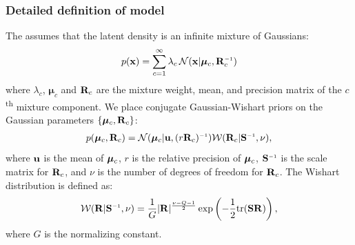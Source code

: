\subsubsection{Detailed definition of model}

The \iwmm{} assumes that the latent density is an infinite mixture of Gaussians:
%
\begin{align}
p(\vx ) = \sum_{c=1}^{\infty} \lambda_c \, {\cal N}(\vx|\bm{\mu}_{c},\vR_{c}\inv)
\end{align}
%
where $\lambda_{c}$, $\bm{\mu}_{c}$ and $\mathbf{R}_{c}$ are the mixture weight, mean, and precision matrix of the $c$\textsuperscript{th} mixture component.
We place conjugate Gaussian-Wishart priors on the Gaussian parameters $\{\bm{\mu}_{c},\mathbf{R}_{c}\}$:
%
\begin{align}
p(\bm{\mu}_{c},\vR_{c})
= {\cal N}(\bm{\mu}_{c}|\vu,(r\vR_{c})\inv)
{\cal W}(\vR_{c}|\vS\inv,\nu),
\label{eq:normal-wishar-prior}
\end{align}
%
where ${\bf{u}}$ is the mean of ${\boldsymbol{\mu}}_c$, $r$ is the relative precision of ${\boldsymbol{\mu}}_c$, $\vS\inv$ is the scale matrix for $\mathbf{R}_c$, and $\nu$ is the number of degrees of freedom for $\mathbf{R}_c$.
The Wishart distribution is defined as:
%
\begin{align}
{\cal W}(\vR|\vS\inv,\nu)=\frac{1}{G}|\vR|^{\frac{\nu-Q-1}{2}}\exp\left(-\frac{1}{2}{\rm tr}(\vS\vR)\right),
\end{align}
%
where $G$ is the normalizing constant.

